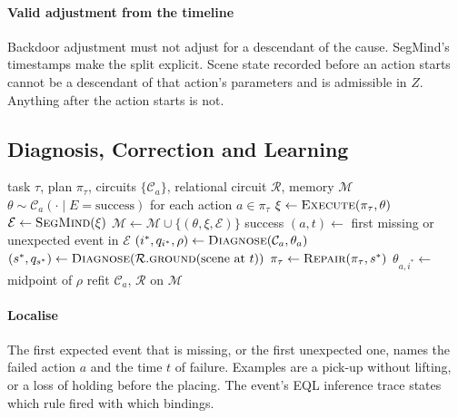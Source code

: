 \documentclass[letterpaper, 10 pt, conference]{ieeeconf}
\newcommand{\segmind}{SegMind}
\newcommand{\eql}{EQL}
\begin{document}
\paragraph*{Valid adjustment from the timeline}
Backdoor adjustment must not adjust for a descendant of the cause. \segmind{}'s
timestamps make the split explicit. Scene state recorded before an action starts
cannot be a descendant of that action's parameters and is admissible in $Z$.
Anything after the action starts is not.

\subsection{Diagnosis, Correction and Learning}
\label{sec:loop}

\begin{algorithm}[t]
  \caption{Event-grounded causal recovery}
  \label{alg:loop}
  \small
  \begin{algorithmic}[1]
    \Require task $\tau$, plan $\pi_\tau$, circuits $\{\mathcal{C}_a\}$, relational circuit $\mathcal{R}$, memory $\mathcal{M}$
    \Loop
      \State $\theta \sim \mathcal{C}_a(\cdot \mid E = \text{success})$ for each action $a \in \pi_\tau$ 
      \State $\xi \gets \textsc{Execute}(\pi_\tau, \theta)$
      \State $\mathcal{E} \gets \textsc{SegMind}(\xi)$ 
      \State $\mathcal{M} \gets \mathcal{M} \cup \{(\theta, \xi, \mathcal{E})\}$
       \Return success \EndIf
      \State $(a, t) \gets$ first missing or unexpected event in $\mathcal{E}$ 
      \State $(i^\ast, q_{i^\ast}, \rho) \gets \textsc{Diagnose}(\mathcal{C}_a, \theta_a)$
      \State $(s^\ast, q_{s^\ast}) \gets \textsc{Diagnose}(\mathcal{R}.\textsc{ground}(\text{scene at } t))$
       $\pi_\tau \gets \textsc{Repair}(\pi_\tau, s^\ast)$
      \Else{} $\theta_{a,i^\ast} \gets$ midpoint of $\rho$ \EndIf
      \State refit $\mathcal{C}_a$, $\mathcal{R}$ on $\mathcal{M}$ 
    \EndLoop
  \end{algorithmic}
\end{algorithm}

\paragraph*{Localise}
The first expected event that is missing, or the first unexpected one, names
the failed action $a$ and the time $t$ of failure. Examples are a pick-up
without lifting, or a loss of holding before the placing. The event's \eql{}
inference trace states which rule fired with which bindings.
\end{document}

